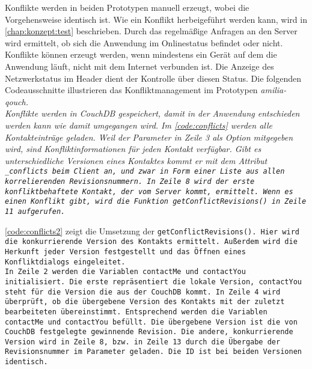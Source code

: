 Konflikte werden in beiden Prototypen manuell erzeugt, wobei die Vorgehensweise identisch ist.
Wie ein Konflikt herbeigeführt werden kann, wird in \autoref{chap:konzept:test} beschrieben.
Durch das regelmäßige Anfragen an den Server wird ermittelt, ob sich die Anwendung im Onlinestatus befindet oder nicht.
Konflikte können erzeugt werden, wenn mindestens ein Gerät auf dem die Anwendung läuft, nicht mit dem Internet verbunden ist.
Die Anzeige des Netzwerkstatus im Header dient der Kontrolle über diesen Status.
Die folgenden Codeausschnitte illustrieren das Konfliktmanagement im Prototypen \it{amilia-qouch}.\\
Konflikte werden in CouchDB gespeichert, damit in der Anwendung entschieden werden kann wie damit umgegangen wird.
Im \autoref{code:conflicts} werden alle Kontakteinträge geladen.
Weil der Parameter in Zeile 3 als Option mitgegeben wird, sind Konfliktinformationen für jeden Kontakt verfügbar.
Gibt es unterschiedliche Versionen eines Kontaktes kommt er mit dem Attribut \tt{\_conflicts} beim Client an, und zwar in Form einer Liste aus allen korrelierenden Revisionsnummern.
In Zeile 8 wird der erste konfliktbehaftete Kontakt, der vom Server kommt, ermittelt.
Wenn es einen Konflikt gibt, wird die Funktion \tt{getConflictRevisions()} in Zeile 11 aufgerufen.
%
\begin{center}
  
\end{center}
%
\autoref{code:conflicts2} zeigt die Umsetzung der \tt{getConflictRevisions()}.
Hier wird die konkurrierende Version des Kontakts ermittelt.
Außerdem wird die Herkunft jeder Version festgestellt und das Öffnen eines Konfliktdialogs eingeleitet.\\
In Zeile 2 werden die Variablen \tt{contactMe} und \tt{contactYou} initialisiert.
Die erste repräsentiert die lokale Version, \tt{contactYou} steht für die Version die aus der CouchDB kommt.
In Zeile 4 wird überprüft, ob die übergebene Version des Kontakts mit der zuletzt bearbeiteten übereinstimmt.
Entsprechend werden die Variablen \tt{contactMe} und \tt{contactYou} befüllt.
Die übergebene Version ist die von CouchDB festgelegte gewinnende Revision.
Die andere, konkurrierende Version wird in Zeile 8, bzw. in Zeile 13 durch die Übergabe der Revisionsnummer im Parameter geladen.
Die ID ist bei beiden Versionen identisch.\\
